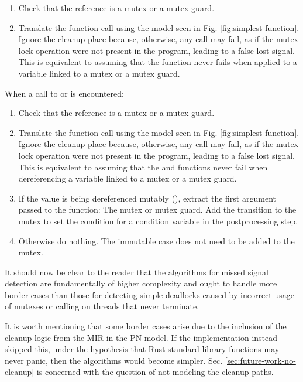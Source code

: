 \begin{enumerate}
      \item Check that the  reference is a mutex or a mutex guard.
      \item Translate the function call using the model seen in Fig. \ref{fig:simplest-function}.
            Ignore the cleanup place because, otherwise, any call may fail,
            as if the mutex lock operation
            were not present in the program, leading to a false lost signal.
            This is equivalent to assuming that the  function never fails
            when applied to a variable linked to a mutex or a mutex guard.
\end{enumerate}

When a call to 
or  is encountered:

\begin{enumerate}
      \item Check that the  reference is a mutex or a mutex guard.
      \item Translate the function call using the model seen in Fig. \ref{fig:simplest-function}.
            Ignore the cleanup place because, otherwise, any call may fail,
            as if the mutex lock operation
            were not present in the program, leading to a false lost signal.
            This is equivalent to assuming that the 
            and  functions never fail
            when dereferencing a variable linked to a mutex or a mutex guard.
      \item If the value is being dereferenced mutably (),
            extract the first argument passed to the function: The mutex or mutex guard.
            Add the  transition to the mutex
            to set the condition for a condition variable in the postprocessing step.
      \item Otherwise do nothing.
            The immutable case does not need to be added to the mutex.
\end{enumerate}

It should now be clear to the reader that the algorithms for missed signal detection are
fundamentally of higher complexity and ought to handle more border cases than
those for detecting simple deadlocks caused by incorrect usage of mutexes or
calling  on threads that never terminate.

It is worth mentioning that some border cases arise
due to the inclusion of the cleanup logic
from the \acrshort{MIR} in the \acrshort{PN} model.
If the implementation instead skipped this,
under the hypothesis that Rust standard library functions may never panic,
then the algorithms would become simpler.
Sec. \ref{sec:future-work-no-cleanup} is concerned with
the question of not modeling the cleanup paths.